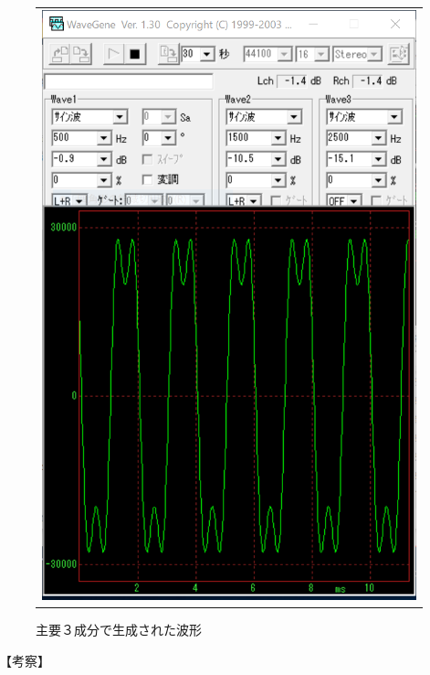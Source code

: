 \documentclass[uplatex, titlepage]{jsarticle}
\begin{document}
\begin{figure}[H]
\begin{tabular}{c}
      \begin{minipage}{0.45\hsize}
        \begin{center}
          \includegraphics[scale=0.45]{./tuusin1.2/sqmake01.png}
          \caption{主要３成分で生成された波形}
          \label{fig:sqmake01}
        \end{center}
      \end{minipage}

    \end{tabular}
\end{figure}

【考察】
\end{document}
